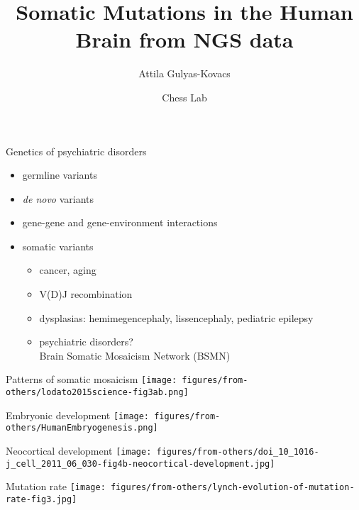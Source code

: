 \documentclass{beamer}
\title{Somatic Mutations in the Human Brain from NGS data}
\author{Attila Gulyas-Kovacs}
\date{Chess Lab}
\begin{document}
\maketitle

\begin{frame}{Genetics of psychiatric disorders}
\begin{itemize}
\item germline variants
\item \textit{de novo} variants
\item<2-> gene-gene and gene-environment interactions  
\item<3-> somatic variants
\begin{itemize}
\item cancer, aging
\item V(D)J recombination
\item dysplasias: hemimegencephaly, lissencephaly, pediatric epilepsy 
\item<4-> \alert{psychiatric disorders?}\\
Brain Somatic Mosaicism Network (BSMN)
\end{itemize}
\end{itemize}
\end{frame}

\begin{frame}{Patterns of somatic mosaicism}
\texttt{[image: figures/from-others/lodato2015science-fig3ab.png]}
\end{frame}

\begin{frame}{Embryonic development}
\texttt{[image: figures/from-others/HumanEmbryogenesis.png]}
\end{frame}

\begin{frame}{Neocortical development}
\texttt{[image: figures/from-others/doi\_10\_1016-j\_cell\_2011\_06\_030-fig4b-neocortical-development.jpg]}
\end{frame}

\begin{frame}{Mutation rate}
\texttt{[image: figures/from-others/lynch-evolution-of-mutation-rate-fig3.jpg]}
\end{frame}
\end{document}
